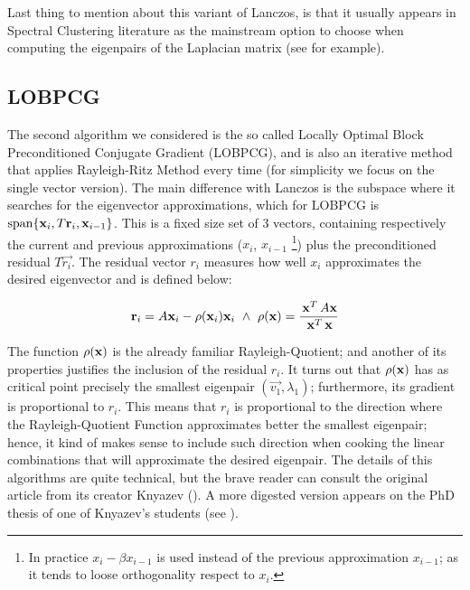 Last thing to mention about this variant of Lanczos, is that it
usually appears in Spectral Clustering literature as the mainstream
option to choose when computing the eigenpairs of the
Laplacian matrix (see \cite{luxburg07} for example). 

\subsection{LOBPCG}

The second algorithm we considered is the so called Locally Optimal
Block Preconditioned Conjugate Gradient (LOBPCG), and is also an
iterative method that applies Rayleigh-Ritz Method every time (for
simplicity we focus on the single vector version). The main difference
with Lanczos is the subspace where it searches for the eigenvector
approximations, which for LOBPCG is $\operatorname{span} \{\mathbf{x}_i,
T\mathbf{r}_i, \mathbf{x}_{i-1}\}$. This is a fixed size set of 3 vectors,
containing respectively the current and previous approximations
($x_i$, $x_{i-1}$ \footnote{In practice $x_{i} - \beta x_{i-1}$ is used
  instead of the previous approximation $x_{i-1}$; as it tends to
  loose orthogonality respect to $x_i$.}) plus the preconditioned
residual $T\vec{r_i}$. The residual vector $r_i$ measures how well
$x_i$ approximates the desired eigenvector and is defined below:

\begin{equation*}
    \joinabove{0}
    \vec{r}_i = A\vec{x}_i - \func{\rho}(\vec{x}_i)\vec{x}_i
    \ds{\land}
    \func{\rho}(\vec{x}) = \dfrac{\trans{\vec{x}}A\vec{x}}{\trans{\vec{x}}\vec{x}}
\end{equation*}
\joinbelow{1cm}

The function $\operatorname{\rho}(\mathbf{x})$ is the already familiar 
Rayleigh-Quotient; and another of its properties justifies the
inclusion of the residual $r_i$. It turns out that
$\operatorname{\rho}(\mathbf{x})$ has as critical point precisely the smallest
eigenpair $(\vec{v_1},\lambda_1)$; furthermore, its gradient is
proportional to $r_i$. This means that $r_i$ is proportional to the
direction where the Rayleigh-Quotient Function approximates better
the smallest eigenpair; hence, it kind of makes sense to include such
direction when cooking the linear combinations that will approximate
the desired eigenpair. The details of this algorithms are quite
technical, but the brave reader can consult the original article from
its creator Knyazev (\cite{knyazev01}). A more digested version
appears on the PhD thesis of one of Knyazev's students (see
\cite{lashuk07}).  \\ 

